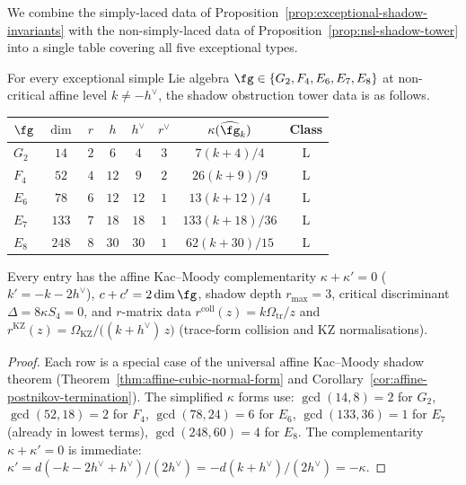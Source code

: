 We combine the simply-laced data of
Proposition~\ref{prop:exceptional-shadow-invariants} with the
non-simply-laced data of Proposition~\ref{prop:nsl-shadow-tower}
into a single table covering all five exceptional types.

\begin{proposition}%
\label{prop:complete-exceptional-shadow}
For every exceptional simple Lie algebra
$\fg \in \{G_2, F_4, E_6, E_7, E_8\}$ at non-critical affine
level $k \neq -h^\vee$, the shadow obstruction tower data is as follows.
\begin{center}
\renewcommand{\arraystretch}{1.4}
\begin{tabular}{lccccccc}
\toprule
$\fg$ & $\dim$ & $r$ & $h$ & $h^\vee$ & $r^\vee$
 & $\kappa(\widehat{\fg}_k)$ & Class \\
\midrule
$G_2$ & $14$ & $2$ & $6$ & $4$ & $3$
 & $7(k+4)/4$ & L \\
$F_4$ & $52$ & $4$ & $12$ & $9$ & $2$
 & $26(k+9)/9$ & L \\
$E_6$ & $78$ & $6$ & $12$ & $12$ & $1$
 & $13(k+12)/4$ & L \\
$E_7$ & $133$ & $7$ & $18$ & $18$ & $1$
 & $133(k+18)/36$ & L \\
$E_8$ & $248$ & $8$ & $30$ & $30$ & $1$
 & $62(k+30)/15$ & L \\
\bottomrule
\end{tabular}
\end{center}
Every entry has the affine Kac--Moody complementarity
$\kappa + \kappa' = 0$
\textup{(}$k' = -k - 2h^\vee$\textup{)}, $c + c' = 2\dim\fg$,
shadow depth $r_{\max} = 3$, critical discriminant
$\Delta = 8\kappa S_4 = 0$, and
$r$-matrix data
$r^{\mathrm{coll}}(z)=k\Omega_{\mathrm{tr}}/z$ and
$r^{\mathrm{KZ}}(z)=
\Omega_{\mathrm{KZ}}/\bigl((k{+}h^\vee)\,z\bigr)$
\textup{(}trace-form collision and KZ normalisations\textup{)}.
\end{proposition}

\begin{proof}
Each row is a special case of the universal affine Kac--Moody
shadow theorem (Theorem~\ref{thm:affine-cubic-normal-form}
and Corollary~\ref{cor:affine-postnikov-termination}). The
simplified $\kappa$ forms use:
$\gcd(14, 8) = 2$ for $G_2$,
$\gcd(52, 18) = 2$ for $F_4$,
$\gcd(78, 24) = 6$ for $E_6$,
$\gcd(133, 36) = 1$ for $E_7$ (already in lowest terms),
$\gcd(248, 60) = 4$ for $E_8$.
The complementarity $\kappa + \kappa' = 0$ is immediate:
$\kappa' = d(-k-2h^\vee+h^\vee)/(2h^\vee)
= -d(k+h^\vee)/(2h^\vee) = -\kappa$.
\end{proof}

